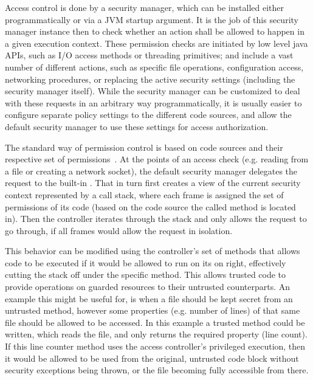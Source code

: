 	Access control is done by a security manager, which can be installed either programmatically or via a JVM startup argument. It is the job of this security manager instance then to check whether an action shall be allowed to happen in a given execution context. These permission checks are initiated by low level java APIs, such as I/O access methods or threading primitives; and include a vast number of different actions, such as specific file operations, configuration access, networking procedures, or replacing the active security settings (including the security manager itself). While the security manager can be customized to deal with these requests in an arbitrary way programmatically, it is usually easier to configure separate policy settings to the different code sources, and allow the default security manager to use these settings for access authorization.
	
	The standard way of permission control is based on code sources and their respective set of permissions~\cite{JavaAccessControl}. At the points of an access check (e.g. reading from a file or creating a network socket), the default security manager delegates the request to the built-in . That in turn first creates a view of the current security context represented by a call stack, where each frame is assigned the set of permissions of its code (based on the code source the called method is located in). Then the controller iterates through the stack and only allows the request to go through, if all frames would allow the request in isolation.
	
	This behavior can be modified using the controller's set of  methods that allows code to be executed if it would be allowed to run on its on right, effectively cutting the stack off under the specific method. This allows trusted code to provide operations on guarded resources to their untrusted counterparts. An example this might be useful for, is when a file should be kept secret from an untrusted method, however some properties (e.g. number of lines) of that same file should be allowed to be accessed. In this example a trusted method could be written, which reads the file, and only returns the required property (line count). If this line counter method uses the access controller's privileged execution, then it would be allowed to be used from the original, untrusted code block without security exceptions being thrown, or the file becoming fully accessible from there.

